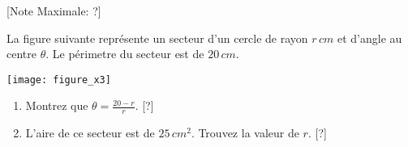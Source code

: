 \begin{question}
  \hspace*{\fill} [Note Maximale: ?]\par
  \medskip
  \noindent La figure suivante représente un secteur d'un cercle de rayon $r\,cm$ et d'angle au centre $\theta$. Le périmetre du secteur est de $20\,cm$.\par
  \medskip
  \begin{center} %
    \texttt{[image: figure\_x3]}\par
  \end{center} %
  \begin{enumerate}[label=(\alph*)]
    \item Montrez que $\theta = \frac{20 - r}{r}$.\hspace*{\fill} [?]
    \item L'aire de ce secteur est de $25\,cm^2$. Trouvez la valeur de $r$.\hspace*{\fill} [?]
  \end{enumerate}
\end{question}
